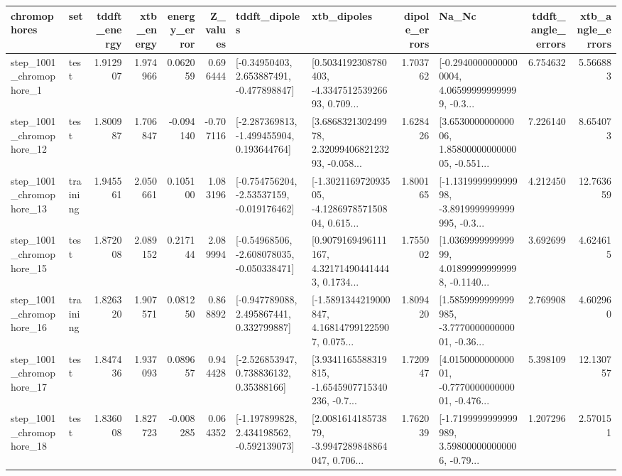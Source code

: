 \begin{tabular}{llrrrrllrlrr}
\toprule
             chromophores &       set &  tddft\_energy &  xtb\_energy &  energy\_error &  Z\_values &                               tddft\_dipoles &                                        xtb\_dipoles &  dipole\_errors &                                              Na\_Nc &  tddft\_angle\_errors &  xtb\_angle\_errors \\
\midrule
  step\_1001\_chromophore\_1 &      test &      1.912907 &    1.974966 &      0.062059 &  0.696444 &    [-0.34950403, 2.653887491, -0.477898847] &  [0.5034192308780403, -4.334751253926693, 0.709... &       1.703762 &  [-0.29400000000000004, 4.065999999999999, -0.3... &            6.754632 &          5.566883 \\
 step\_1001\_chromophore\_12 &      test &      1.800987 &    1.706847 &     -0.094140 & -0.707116 &   [-2.287369813, -1.499455904, 0.193644764] &  [3.686832130249978, 2.3209940682123293, -0.058... &       1.628426 &  [3.653000000000006, 1.8580000000000005, -0.551... &            7.226140 &          8.654073 \\
 step\_1001\_chromophore\_13 &  training &      1.945561 &    2.050661 &      0.105100 &  1.083196 &   [-0.754756204, -2.53537159, -0.019176462] &  [-1.302116972093505, -4.128697857150804, 0.615... &       1.800165 &  [-1.131999999999998, -3.8919999999999995, -0.3... &            4.212450 &         12.763659 \\
 step\_1001\_chromophore\_15 &      test &      1.872008 &    2.089152 &      0.217144 &  2.089994 &   [-0.54968506, -2.608078035, -0.050338471] &  [0.9079169496111167, 4.321714904414443, 0.1734... &       1.755002 &  [1.036999999999999, 4.018999999999998, -0.1140... &            3.692699 &          4.624615 \\
 step\_1001\_chromophore\_16 &  training &      1.826320 &    1.907571 &      0.081250 &  0.868892 &    [-0.947789088, 2.495867441, 0.332799887] &  [-1.5891344219000847, 4.168147991225907, 0.075... &       1.809420 &  [1.5859999999999985, -3.777000000000001, -0.36... &            2.769908 &          4.602960 \\
 step\_1001\_chromophore\_17 &      test &      1.847436 &    1.937093 &      0.089657 &  0.944428 &     [-2.526853947, 0.738836132, 0.35388166] &  [3.9341165588319815, -1.6545907715340236, -0.7... &       1.720947 &  [4.015000000000001, -0.777000000000001, -0.476... &            5.398109 &         12.130757 \\
 step\_1001\_chromophore\_18 &      test &      1.836008 &    1.827723 &     -0.008285 &  0.064352 &   [-1.197899828, 2.434198562, -0.592139073] &  [2.008161418573879, -3.9947289848864047, 0.706... &       1.762039 &  [-1.7199999999999989, 3.598000000000006, -0.79... &            1.207296 &          2.570151 \\

\end{tabular}
